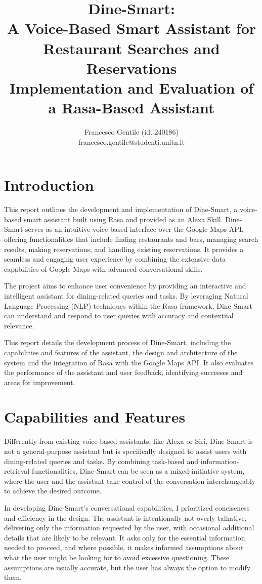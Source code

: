 \documentclass[twocolumn]{article}
\title{%
    \vspace{-2cm}
    \textbf{Dine-Smart: \\ A Voice-Based Smart Assistant for Restaurant Searches and Reservations} \\
    \vspace{0.5cm}
    \large Implementation and Evaluation of a Rasa-Based Assistant
}
\author{
    Francesco Gentile (id. 240186) \\
    francesco.gentile@studenti.unitn.it \\
}
\date{}
\begin{document}
\maketitle

\section{Introduction}

This report outlines the development and implementation of Dine-Smart, a voice-based smart assistant built using Rasa and provided as an Alexa Skill. Dine-Smart serves as an intuitive voice-based interface over the Google Maps API, offering functionalities that include finding restaurants and bars, managing search results, making reservations, and handling existing reservations. It provides a seamless and engaging user experience by combining the extensive data capabilities of Google Maps with advanced conversational skills.

The project aims to enhance user convenience by providing an interactive and intelligent assistant for dining-related queries and tasks. By leveraging Natural Language Processing (NLP) techniques within the Rasa framework, Dine-Smart can understand and respond to user queries with accuracy and contextual relevance.

This report details the development process of Dine-Smart, including the capabilities and features of the assistant, the design and architecture of the system and the integration of Rasa with the Google Maps API. It also evaluates the performance of the assistant and user feedback, identifying successes and areas for improvement.

\section{Capabilities and Features}

Differently from existing voice-based assistants, like Alexa or Siri, Dine-Smart is not a general-purpose assistant but is specifically designed to assist users with dining-related queries and tasks. By combining task-based and information-retrieval functionalities, Dine-Smart can be seen as a mixed-initiative system, where the user and the assistant take control of the conversation interchangeably to achieve the desired outcome.

In developing Dine-Smart's conversational capabilities, I prioritized conciseness and efficiency in the design. The assistant is intentionally not overly talkative, delivering only the information requested by the user, with occasional additional details that are likely to be relevant. It asks only for the essential information needed to proceed, and where possible, it makes informed assumptions about what the user might be looking for to avoid excessive questioning. These assumptions are usually accurate, but the user has always the option to modify them.
\end{document}
